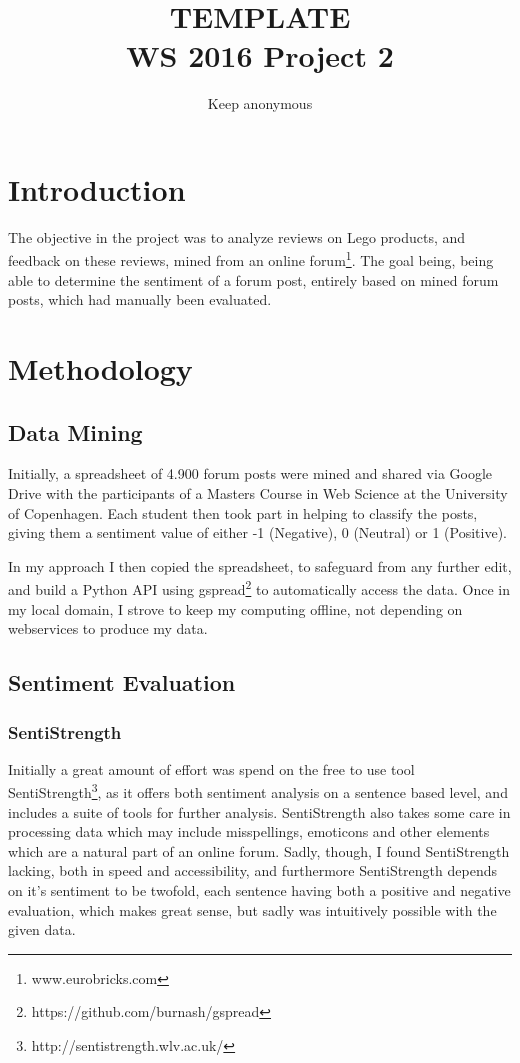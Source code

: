\documentclass{sig-alternate}
\begin{document}
\title{TEMPLATE\\WS 2016 Project 2}
\author{
\alignauthor 
Keep anonymous
}
\maketitle


\section{Introduction}
The objective in the project was to analyze reviews on Lego products, and feedback on these reviews, mined from an online forum\footnote{www.eurobricks.com}.
The goal being, being able to determine the sentiment of a forum post, entirely based on mined forum posts, which had manually been evaluated.
\section{Methodology}
\subsection{Data Mining}
Initially, a spreadsheet of 4.900 forum posts were mined and shared via Google Drive with the participants of a Masters Course in Web Science at the University of Copenhagen. Each student then took part in helping to classify the posts, giving them a sentiment value of either -1 (Negative), 0 (Neutral) or 1 (Positive).

In my approach I then copied the spreadsheet, to safeguard from any further edit, and build a Python API using gspread\footnote{https://github.com/burnash/gspread} to automatically access the data. Once in my local domain, I strove to keep my computing offline, not depending on webservices to produce my data.

\subsection{Sentiment Evaluation}
\subsubsection{SentiStrength}
Initially a great amount of effort was spend on the free to use tool SentiStrength\footnote{http://sentistrength.wlv.ac.uk/}, as it offers both sentiment analysis on a sentence based level, and includes a suite of tools for further analysis. SentiStrength also takes some care in processing data which may include misspellings, emoticons and other elements which are a natural part of an online forum. Sadly, though, I found SentiStrength lacking, both in speed and accessibility, and furthermore SentiStrength depends on it's sentiment to be twofold, each sentence having both a positive and negative evaluation, which makes great sense, but sadly was intuitively possible with the given data. 
\end{document}
